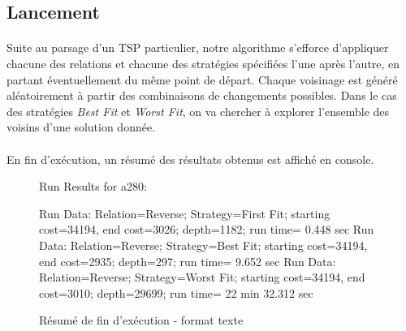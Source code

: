 \documentclass[a4paper,10pt]{report}
\begin{document}
\subsection{Lancement}

\paragraph{}
  Suite au parsage d'un TSP particulier, notre algorithme s'efforce d'appliquer
chacune des relations et chacune des stratégies spécifiées l'une après l'autre,
en partant éventuellement du même point de départ. Chaque voisinage est généré
aléatoirement à partir des combinaisons de changements possibles. Dans le cas
des stratégies \textit{Best Fit} et \textit{Worst Fit}, on va chercher à
explorer l'ensemble des voisins d'une solution donnée.

\paragraph{}
En fin d'exécution, un résumé des résultats obtenus est affiché en console.

\begin{figure}[h]
Run Results for a280:
 \begin{center}
Run Data: Relation=Reverse;	Strategy=First Fit;	starting cost=34194,
  end cost=3026;	depth=1182;	run time= 0.448 sec\linebreak
Run Data: Relation=Reverse;	Strategy=Best Fit;	starting cost=34194,
  end cost=2935;	depth=297;	run time= 9.652 sec\linebreak
Run Data: Relation=Reverse;	Strategy=Worst Fit;	starting cost=34194,
  end cost=3010;	depth=29699;	run time= 22 min 32.312 sec\linebreak
 \end{center}
  \label{a280-sample-results}
  \caption{Résumé de fin d'exécution - format texte}
\end{figure}
\end{document}
